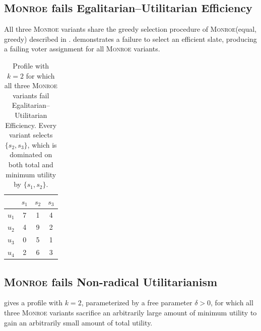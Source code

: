 \documentclass[11pt]{article}
\newcommand{\Monroe}{\textsc{Monroe}}
\begin{document}

\subsection{\Monroe{} fails Egalitarian--Utilitarian Efficiency}
\label{app:monroe-egal-util}

All three \Monroe{} variants share the greedy selection procedure of
\Monroe(equal, greedy) described in .  demonstrates a failure to select an efficient slate, producing a failing voter assignment for all \Monroe{} variants.

\begin{table}[t]
\centering
\begin{tabular}{lccc}
\hline
 & $s_1$ & $s_2$ & $s_3$ \\
\hline
$u_1$ & 7 & 1 & 4 \\
$u_2$ & 4 & 9 & 2 \\
$u_3$ & 0 & 5 & 1 \\
$u_4$ & 2 & 6 & 3 \\
\hline
\end{tabular}
\caption{Profile with $k=2$ for which all three \Monroe{} variants fail
Egalitarian--Utilitarian Efficiency. Every variant selects $\{s_2,s_3\}$, which
is dominated on both total and minimum utility by $\{s_1,s_2\}$.}
\label{tab:failure-monroe-egal-util}
\end{table}

\subsection{\Monroe{} fails Non-radical Utilitarianism}
\label{app:monroe-nru}

 gives a profile with \(k=2\), parameterized by a
free parameter \(\delta>0\), for which all three \Monroe{} variants sacrifice an
arbitrarily large amount of minimum utility to gain an arbitrarily small amount
of total utility.
\end{document}
